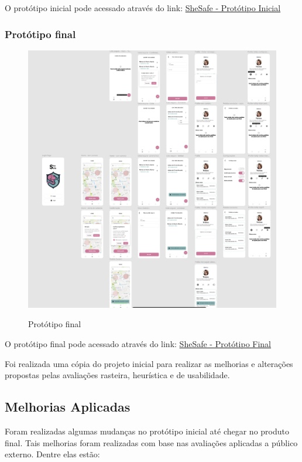 O protótipo inicial pode acessado através do link: \href{https://www.figma.com/proto/ZOxt5eHuQt0RjhagaDpuXU/SheSafe?type=design&node-id=26-369&viewport=1892%2C1064%2C0.71&t=gZiNpzVt2mGhuMDV-0&scaling=min-zoom&starting-point-node-id=26%3A653}{SheSafe - Protótipo Inicial}

\subsubsection{Protótipo final}
\begin{figure}[h]
	\begin{center}
		\includegraphics[width=0.7\linewidth]{images/prototipo-final.png}\\
	\end{center}
	\caption[Protótipo final]{Protótipo final}
	\label{fig:prototipo-final}
\end{figure}
\pagebreak
O protótipo final pode acessado através do link: \href{https://www.figma.com/proto/GALwTZKTsmvOVWX4JARmOB/SheSafe-Corrigido?node-id=26-653&viewport=2654%2C786%2C0.79&t=dkVCQTw83BbPw3KK-0&scaling=min-zoom&starting-point-node-id=26%3A653}{SheSafe - Protótipo Final}

Foi realizada uma cópia do projeto inicial para realizar as melhorias e alterações propostas pelas avaliações rasteira, heurística e de usabilidade.

\subsection{Melhorias Aplicadas}
Foram realizadas algumas mudanças no protótipo inicial até chegar no produto final. Tais melhorias foram realizadas com base nas avaliações aplicadas a público externo. Dentre elas estão:

